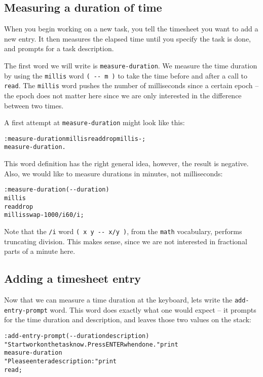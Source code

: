 \documentclass[english]{article}
\begin{document}
{\subsection{Measuring a duration of time}

When you begin working on a new task, you tell the timesheet you want
to add a new entry. It then measures the elapsed time until you specify
the task is done, and prompts for a task description.

The first word we will write is \texttt{measure-duration}. We measure
the time duration by using the \texttt{millis} word \texttt{( -{}-
m )} to take the time before and after a call to \texttt{read}. The
\texttt{millis} word pushes the number of milliseconds since a certain
epoch -- the epoch does not matter here since we are only interested
in the difference between two times.

A first attempt at \texttt{measure-duration} might look like this:

\begin{alltt}
: measure-duration millis read drop millis - ;
measure-duration .
\end{alltt}

This word definition has the right general idea, however, the result
is negative. Also, we would like to measure durations in minutes,
not milliseconds:

\begin{alltt}
: measure-duration ( -{}- duration )
    millis
    read drop
    millis swap - 1000 /i 60 /i ;
\end{alltt}

Note that the \texttt{/i} word \texttt{( x y -{}- x/y )}, from the
\texttt{math} vocabulary, performs truncating division. This
makes sense, since we are not interested in fractional parts of a
minute here.

\subsection{Adding a timesheet entry}

Now that we can measure a time duration at the keyboard, lets write
the \texttt{add-entry-prompt} word. This word does exactly what one
would expect -- it prompts for the time duration and description,
and leaves those two values on the stack:

\begin{alltt}
: add-entry-prompt ( -{}- duration description )
    "Start work on the task now. Press ENTER when done." print
    measure-duration
    "Please enter a description:" print
    read ;
\end{alltt}

}
\end{document}
